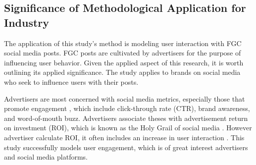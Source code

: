\documentclass{article}
\begin{document}
\subsection{Significance of Methodological Application for Industry}

The application of this study's method is modeling user interaction with FGC social media posts. FGC posts are cultivated by advertisers for the purpose of influencing user behavior. Given the applied aspect of this research, it is worth outlining its applied significance. The study applies to brands on social media who seek to influence users with their posts.

Advertisers are most concerned with social media metrics, especially those that promote engagement \cite{Tiago2014}, which include click-through rate (CTR), brand awareness, and word-of-mouth buzz. Advertisers associate theses with advertisement return on investment (ROI), which is known as the Holy Grail of social media \cite{Fisher2009}. However advertiser calculate ROI, it often includes an increase in user interaction \cite{Romero2011, Schacht2015}. This study successfully models user engagement, which is of great interest advertisers and social media platforms.  


\end{document}
